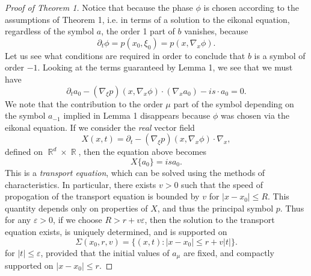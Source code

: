 \documentclass{article}
\theoremstyle{plain}
\theoremstyle{remark}
\theoremstyle{definition}
\DeclareMathOperator{\RR}{\mathbb{R}}
\begin{document}
\begin{proof}[Proof of Theorem 1]

Notice that because the phase $\phi$ is chosen according to the assumptions of Theorem 1, i.e. in terms of a solution to the eikonal equation, regardless of the symbol $a$, the order 1 part of $b$ vanishes, because
%
\[ \partial_t \phi = p(x_0, \xi_0) = p(x, \nabla_x \phi). \]
%
Let us see what conditions are required in order to conclude that $b$ is a symbol of order $-1$. Looking at the terms guaranteed by Lemma 1, we see that we must have
%
\[ \partial_t a_0 - (\nabla_\xi p)(x, \nabla_x \phi) \cdot (\nabla_x a_0) - i s \cdot a_0 = 0. \]
%
We note that the contribution to the order $\mu$ part of the symbol depending on the symbol $a_{-1}$ implied in Lemma 1 disappears because $\phi$ was chosen via the eikonal equation. If we consider the \emph{real} vector field
%
\[ X(x,t) = \partial_t - (\nabla_\xi p)(x,\nabla_x \phi) \cdot \nabla_x, \]
%
defined on $\RR^d \times \RR$, then the equation above becomes
%
\[ X \{ a_0 \} = i s a_0. \]
%
This is a \emph{transport equation}, which can be solved using the methods of characteristics. In particular, there exists $v > 0$ such that the speed of propogation of the transport equation is bounded by $v$ for $|x - x_0| \leq R$. This quantity depends only on properties of $X$, and thus the principal symbol $p$. Thus for any $\varepsilon > 0$, if we choose $R > r + v \varepsilon$, then the solution to the transport equation exists, is uniquely determined, and is supported on
%
\[ \Sigma(x_0,r,v) = \{ (x,t) : |x - x_0| \leq r + v |t| \}. \]
%
for $|t| \leq \varepsilon$, provided that the initial values of $a_\mu$ are fixed, and compactly supported on $|x - x_0| \leq r$.


\end{proof}
\end{document}
